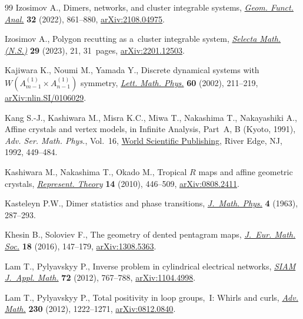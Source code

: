 \begin{thebibliography}{99}
Izosimov A., Dimers, networks, and cluster integrable systems,
 \href{https://doi.org/10.1007/s00039-022-00605-8}{\textit{Geom. Funct.
 Anal.}} \textbf{32} (2022), 861--880,
 \href{http://arxiv.org/abs/2108.04975}{arXiv:2108.04975}.

Izosimov A., Polygon recutting as a~cluster integrable system,
 \href{https://doi.org/10.1007/s00029-023-00826-1}{\textit{Selecta Math.
 (N.S.)}} \textbf{29} (2023), 21, 31~pages,
 \href{http://arxiv.org/abs/2201.12503}{arXiv:2201.12503}.

Kajiwara K., Noumi M., Yamada Y., Discrete dynamical systems with
 {$W(A_{m-1}^{(1)}\times A_{n-1}^{(1)})$} symmetry,
 \href{https://doi.org/10.1023/A:1016298925276}{\textit{Lett. Math. Phys.}}
 \textbf{60} (2002), 211--219,
 \href{http://arxiv.org/abs/nlin.SI/0106029}{arXiv:nlin.SI/0106029}.

Kang S.-J., Kashiwara M., Misra K.C., Miwa T., Nakashima T., Nakayashiki A.,
 Affine crystals and vertex models, in Infinite Analysis, {P}art~{A}, {B}
 ({K}yoto, 1991), \textit{Adv. Ser. Math. Phys.}, Vol.~16,
 \href{https://doi.org/10.1142/s0217751x92003896}{World Scientific Publishing},
 River Edge, NJ, 1992, 449--484.

Kashiwara M., Nakashima T., Okado M., Tropical {$R$} maps and affine geometric
 crystals,
 \href{https://doi.org/10.1090/S1088-4165-2010-00379-9}{\textit{Represent.
 Theory}} \textbf{14} (2010), 446--509,
 \href{http://arxiv.org/abs/0808.2411}{arXiv:0808.2411}.

Kasteleyn P.W., Dimer statistics and phase transitions,
 \href{https://doi.org/10.1063/1.1703953}{\textit{J.~Math. Phys.}} \textbf{4}
 (1963), 287--293.

Khesin B., Soloviev F., The geometry of dented pentagram maps,
 \href{https://doi.org/10.4171/JEMS/586}{\textit{J.~Eur. Math. Soc.}}
 \textbf{18} (2016), 147--179,
 \href{http://arxiv.org/abs/1308.5363}{arXiv:1308.5363}.

Lam T., Pylyavskyy P., Inverse problem in cylindrical electrical networks,
 \href{https://doi.org/10.1137/110846476}{\textit{SIAM J.~Appl. Math.}}
 \textbf{72} (2012), 767--788,
 \href{http://arxiv.org/abs/1104.4998}{arXiv:1104.4998}.

Lam T., Pylyavskyy P., Total positivity in loop groups,~{I}: {W}hirls and
 curls, \href{https://doi.org/10.1016/j.aim.2012.03.012}{\textit{Adv. Math.}}
 \textbf{230} (2012), 1222--1271,
 \href{http://arxiv.org/abs/0812.0840}{arXiv:0812.0840}.


\end{thebibliography}
